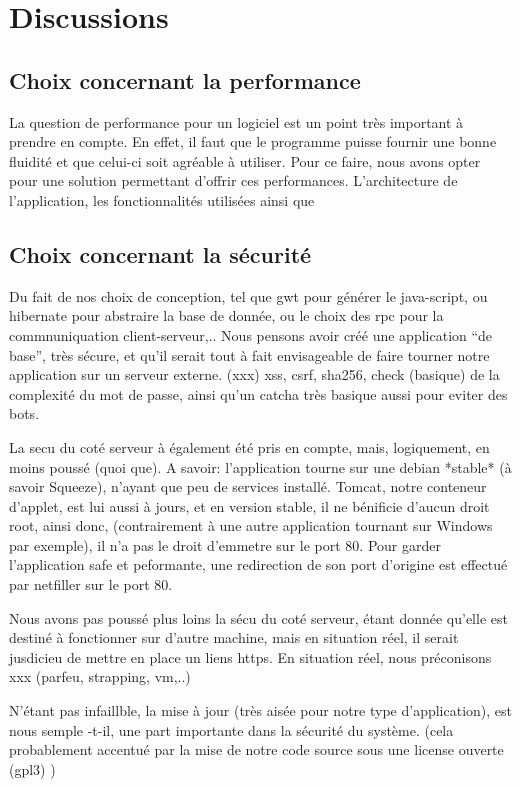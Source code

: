 \chapter{Discussions}
\section{Choix concernant la performance}
La question de performance pour un logiciel est un point très important à prendre en compte. En effet, il faut que le programme puisse fournir une bonne fluidité et que celui-ci soit agréable à utiliser. Pour ce faire, nous avons opter pour une solution permettant d'offrir ces performances. L'architecture de l'application, les fonctionnalités utilisées ainsi que 
\section{Choix concernant la sécurité}

Du fait de nos choix de conception, tel que gwt pour générer le java-script, ou
hibernate pour abstraire la base de donnée, ou le choix des rpc pour la
commnuniquation client-serveur,..  Nous pensons avoir créé une application ``de
base'', très sécure, et qu'il serait tout à fait envisageable de faire tourner notre
application sur un serveur externe.
(xxx) xss, csrf, sha256, check (basique) de la complexité du mot de passe, ainsi
qu'un catcha très basique aussi pour eviter des bots.

La secu du coté serveur à également été pris en compte, mais, logiquement, en
moins poussé (quoi que).  A savoir: l'application tourne sur une debian *stable*
(à savoir Squeeze), n'ayant que peu de services installé.
Tomcat, notre conteneur d'applet, est lui aussi à jours, et en version stable,
il ne bénificie d'aucun droit root, ainsi donc, (contrairement à une autre
application tournant sur Windows par exemple), il n'a pas le droit d'emmetre sur
le port 80. Pour garder l'application safe et peformante, une redirection de
son port d'origine est effectué par netfiller sur le port 80.

Nous avons pas poussé plus loins la sécu du coté serveur, étant donnée qu'elle
est destiné à fonctionner sur d'autre machine, mais en situation réel, il serait
jusdicieu de mettre en place un liens https.  En situation réel, nous
préconisons xxx (parfeu, strapping, vm,..)

N'étant pas infaillble, la mise à jour (très aisée pour notre type
d'application), est nous semple -t-il, une part importante dans la sécurité du
système. (cela probablement accentué par la mise de notre code source sous une
license ouverte (gpl3) )
